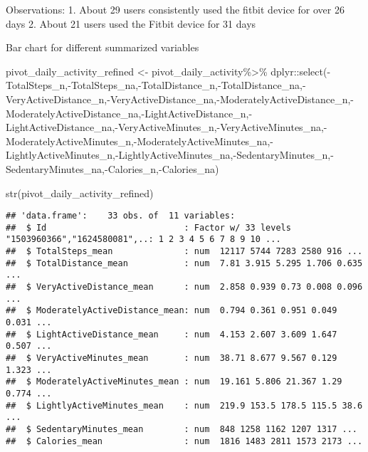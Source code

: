 \documentclass[
]{article}
\newenvironment{Shaded}{\begin{snugshade}}{\end{snugshade}}
\newcommand{\FunctionTok}[1]{\textcolor[rgb]{0.00,0.00,0.00}{#1}}
\newcommand{\NormalTok}[1]{#1}
\newcommand{\OtherTok}[1]{\textcolor[rgb]{0.56,0.35,0.01}{#1}}
\newcommand{\SpecialCharTok}[1]{\textcolor[rgb]{0.00,0.00,0.00}{#1}}
\begin{document}
Observations: 1. About 29 users consistently used the fitbit device for
over 26 days 2. About 21 users used the Fitbit device for 31 days

Bar chart for different summarized variables

\begin{Shaded}
\begin{Highlighting}[]
\NormalTok{pivot\_daily\_activity\_refined }\OtherTok{\textless{}{-}}\NormalTok{ pivot\_daily\_activity}\SpecialCharTok{\%\textgreater{}\%}
\NormalTok{  dplyr}\SpecialCharTok{::}\FunctionTok{select}\NormalTok{(}\SpecialCharTok{{-}}\NormalTok{TotalSteps\_n,}\SpecialCharTok{{-}}\NormalTok{TotalSteps\_na,}\SpecialCharTok{{-}}\NormalTok{TotalDistance\_n,}\SpecialCharTok{{-}}\NormalTok{TotalDistance\_na,}\SpecialCharTok{{-}}\NormalTok{VeryActiveDistance\_n,}\SpecialCharTok{{-}}\NormalTok{VeryActiveDistance\_na,}\SpecialCharTok{{-}}\NormalTok{ModeratelyActiveDistance\_n,}\SpecialCharTok{{-}}\NormalTok{ModeratelyActiveDistance\_na,}\SpecialCharTok{{-}}\NormalTok{LightActiveDistance\_n,}\SpecialCharTok{{-}}\NormalTok{LightActiveDistance\_na,}\SpecialCharTok{{-}}\NormalTok{VeryActiveMinutes\_n,}\SpecialCharTok{{-}}\NormalTok{VeryActiveMinutes\_na,}\SpecialCharTok{{-}}\NormalTok{ModeratelyActiveMinutes\_n,}\SpecialCharTok{{-}}\NormalTok{ModeratelyActiveMinutes\_na,}\SpecialCharTok{{-}}\NormalTok{LightlyActiveMinutes\_n,}\SpecialCharTok{{-}}\NormalTok{LightlyActiveMinutes\_na,}\SpecialCharTok{{-}}\NormalTok{SedentaryMinutes\_n,}\SpecialCharTok{{-}}\NormalTok{SedentaryMinutes\_na,}\SpecialCharTok{{-}}\NormalTok{Calories\_n,}\SpecialCharTok{{-}}\NormalTok{Calories\_na)}

\FunctionTok{str}\NormalTok{(pivot\_daily\_activity\_refined)}
\end{Highlighting}
\end{Shaded}

\begin{verbatim}
## 'data.frame':    33 obs. of  11 variables:
##  $ Id                           : Factor w/ 33 levels "1503960366","1624580081",..: 1 2 3 4 5 6 7 8 9 10 ...
##  $ TotalSteps_mean              : num  12117 5744 7283 2580 916 ...
##  $ TotalDistance_mean           : num  7.81 3.915 5.295 1.706 0.635 ...
##  $ VeryActiveDistance_mean      : num  2.858 0.939 0.73 0.008 0.096 ...
##  $ ModeratelyActiveDistance_mean: num  0.794 0.361 0.951 0.049 0.031 ...
##  $ LightActiveDistance_mean     : num  4.153 2.607 3.609 1.647 0.507 ...
##  $ VeryActiveMinutes_mean       : num  38.71 8.677 9.567 0.129 1.323 ...
##  $ ModeratelyActiveMinutes_mean : num  19.161 5.806 21.367 1.29 0.774 ...
##  $ LightlyActiveMinutes_mean    : num  219.9 153.5 178.5 115.5 38.6 ...
##  $ SedentaryMinutes_mean        : num  848 1258 1162 1207 1317 ...
##  $ Calories_mean                : num  1816 1483 2811 1573 2173 ...
\end{verbatim}
\end{document}
